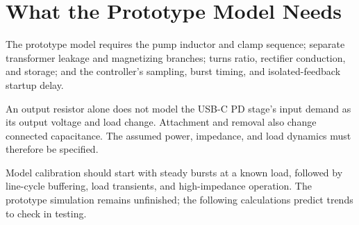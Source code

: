 \section{What the Prototype Model Needs}
\label{sec:sim-cases}

The prototype model requires the pump inductor and clamp sequence; separate transformer leakage and magnetizing branches; turns ratio, rectifier conduction, and storage; and the controller's sampling, burst timing, and isolated-feedback startup delay.

An output resistor alone does not model the USB-C PD stage's input demand as its output voltage and load change. Attachment and removal also change connected capacitance. The assumed power, impedance, and load dynamics must therefore be specified.

Model calibration should start with steady bursts at a known load, followed by line-cycle buffering, load transients, and high-impedance operation. The prototype simulation remains unfinished; the following calculations predict trends to check in testing.
